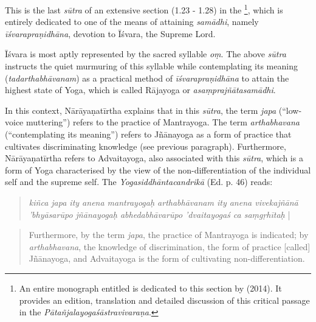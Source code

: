 This is the last \textit{sūtra} of an extensive section (1.23 - 1.28) in the \footnote{An entire monograph entitled  is dedicated to this section by \citeauthor{harimoto2014} (2014). It provides an edition, translation and detailed discussion of this critical passage in the \textit{Pātañjalayogaśāstravivaraṇa}.}, which is entirely dedicated to one of the means of attaining \textit{samādhi}, namely \textit{īśvarapraṇidhāna}, devotion to Īśvara, the Supreme Lord.

Īśvara is most aptly represented by the sacred syllable \textit{oṃ}. The above \textit{sūtra} instructs the quiet murmuring of this syllable while contemplating its meaning (\textit{tadarthabhāvanam}) as a practical method of \textit{īśvarapraṇidhāna} to attain the highest state of Yoga, which is called Rājayoga or \textit{asaṃprajñātasamādhi}.

In this context, Nārāyaṇatīrtha explains that in this \textit{sūtra}, the term \textit{japa} (``low-voice muttering'') refers to the practice of Mantrayoga. The term \textit{arthabhavana} (``contemplating its meaning'') refers to Jñānayoga as a form of practice that cultivates discriminating knowledge (see previous paragraph). Furthermore, Nārāyaṇatīrtha refers to Advaitayoga, also associated with this \textit{sūtra}, which is a form of Yoga characterised by the view of the non-differentiation of the individual self and the supreme self. The \textit{Yogasiddhāntacandrikā} (Ed. p. 46) reads:
\begin{quote}
  \textit{kiñca japa ity anena mantrayogaḥ arthabhāvanam ity anena vivekajñānā 'bhyāsarūpo jñānayogaḥ abhedabhāvarūpo 'dvaitayogaś ca saṃgṛhītaḥ} |
\end{quote}
\begin{quote}
Furthermore, by the term \textit{japa}, the practice of Mantrayoga is indicated; by \textit{arthabhavana}, the knowledge of discrimination, the form of practice [called] Jñānayoga, and Advaitayoga is the form of cultivating non-differentiation.
\end{quote}

